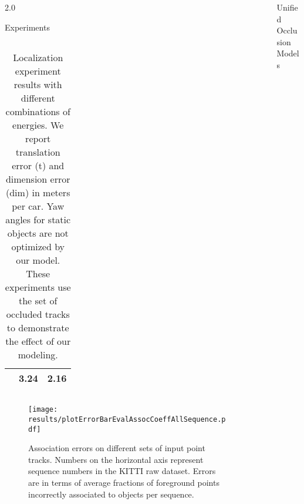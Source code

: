 \documentclass[handout,final]{beamer}
\newlength{\sepwid}
\newlength{\onecolwid}
\begin{document}
\begin{frame}[t]
\begin{columns}[t]
\begin{column}{2.0\onecolwid}
\begin{block}{Experiments}
\begin{columns}[t]
\begin{table}
\begin{tabular}{lrr}
              & {\bf 3.24}  & 2.16\\
              \bottomrule
            \end{tabular}
            \caption{\small Localization experiment results with different combinations of energies. We report translation error (t) and dimension error (dim) in meters per car. Yaw angles for static objects are not optimized by our model. These experiments use the set of occluded tracks to demonstrate the effect of our modeling.}
          \end{table}
        \end{columns}
      
        \begin{figure}[!!t]
          \centering
          \texttt{[image: results/plotErrorBarEvalAssocCoeffAllSequence.pdf]}
		  \caption{\small Association errors on different sets of input point tracks. Numbers on the horizontal axis represent sequence numbers in the KITTI raw dataset. Errors are in terms of average fractions of foreground points incorrectly associated to objects per sequence.}
        \end{figure}
        \newlength{\tblimgwidth}
        \setlength{\tblimgwidth}{0.080\textwidth}
                                        
      \end{block}
    \end{column}
    \begin{column}{\sepwid}\end{column}			%
    \begin{column}{\onecolwid}
      \begin{block}{Unified Occlusion Models}  
      

\end{block}
\end{column}
\end{columns}
\end{frame}
\end{document}
